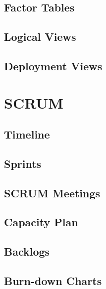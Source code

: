 \documentclass[a4paper,11pt]{article}
\begin{document}
\subsection{Factor Tables}


\subsection{Logical Views}


\subsection{Deployment Views}


\pagebreak
\section{SCRUM}


\subsection{Timeline}


\subsection{Sprints}


\subsection{SCRUM Meetings}


\subsection{Capacity Plan}


\subsection{Backlogs}


\subsection{Burn-down Charts}

\end{document}
